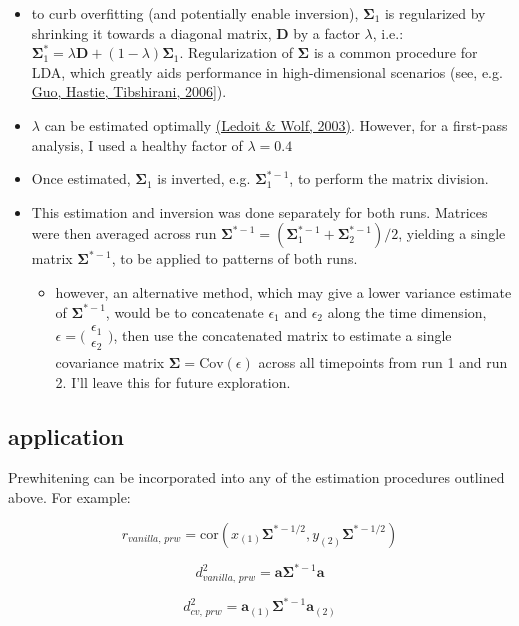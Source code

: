 \documentclass{article}\usepackage[]{graphicx}\usepackage[]{color}
\begin{document}
\begin{itemize}
  \item to curb overfitting (and potentially enable inversion), $\mathbf{\Sigma}_1$ is regularized by shrinking it towards a diagonal matrix, \textbf{D} by a factor $\lambda$, i.e.: 
    $\mathbf{\Sigma}^*_1 = \lambda \mathbf{D} + (1 - \lambda) \mathbf{\Sigma}_1$.
    Regularization of $\mathbf{\Sigma}$ is a common procedure for LDA, which greatly aids performance in high-dimensional scenarios (see, e.g. \href{https://doi.org/10.1093/biostatistics/kxj035}{Guo, Hastie, Tibshirani, 2006}]).
  \item $\lambda$ can be estimated optimally \href{https://repositori.upf.edu/bitstream/handle/10230/560/691.pdf}{(Ledoit \& Wolf, 2003)}.
    However, for a first-pass analysis, I used a healthy factor of $\lambda = 0.4$
  \item Once estimated, $\mathbf{\Sigma}_1$ is inverted, e.g. $\mathbf{\Sigma}^{*-1}_1$, to perform the matrix division.
  \item This estimation and inversion was done separately for both runs. Matrices were then averaged across run
    $\mathbf{\Sigma}^{*-1} = (\mathbf{\Sigma}^{*-1}_1 + \mathbf{\Sigma}^{*-1}_2)/2$, yielding a single matrix $\mathbf{\Sigma}^{*-1}$, to be applied to patterns of both runs.
    \begin{itemize}
      \item however, an alternative method, which may give a lower variance estimate of $\mathbf{\Sigma}^{*-1}$, would be to concatenate $\epsilon_1$ and $\epsilon_2$ along the time dimension,
        $\epsilon = \big(\begin{smallmatrix}
        \epsilon_1\\
        \epsilon_2
        \end{smallmatrix}\big)$,
        then use the concatenated matrix to estimate a single covariance matrix $\mathbf{\Sigma} = \text{Cov}(\epsilon)$ across all timepoints from run 1 and run 2.
        I'll leave this for future exploration.
    \end{itemize}
\end{itemize}


\subsection*{application}

Prewhitening can be incorporated into any of the estimation procedures outlined above.
For example:

\[r_\textit{vanilla, prw} = \text{cor}(x_{(1)}\mathbf{\Sigma}^{*-1/2}, y_{(2)}\mathbf{\Sigma}^{*-1/2})\]

\[d^2_\textit{vanilla, prw} = \mathbf{a} \mathbf{\Sigma}^{*-1} \mathbf{a}\]

\[d^2_\textit{cv, prw} = \mathbf{a}_{(1)} \mathbf{\Sigma}^{*-1} \mathbf{a}_{(2)}\]
\end{document}
